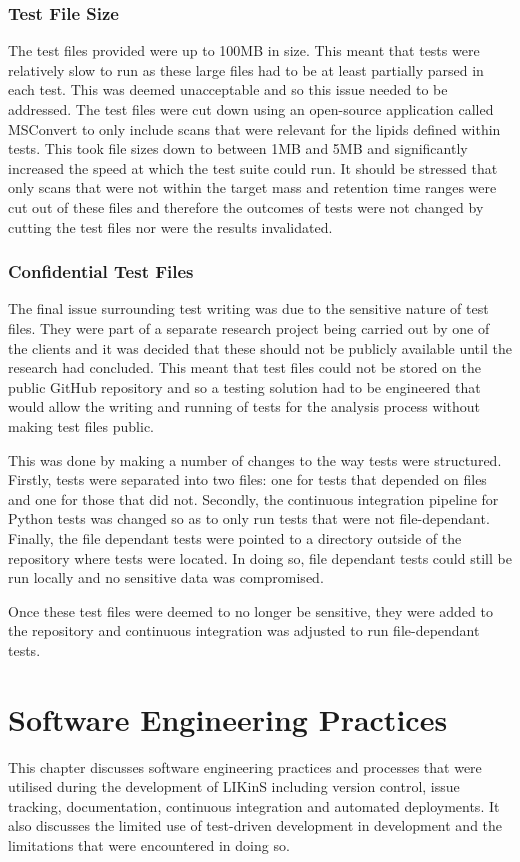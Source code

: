 \documentclass{l4proj}
\begin{document}
\subsection{Test File Size}
The test files provided were up to 100MB in size. This meant that tests were relatively slow to run as these large files had to be at least partially parsed in each test. This was deemed unacceptable and so this issue needed to be addressed. The test files were cut down using an open-source application called MSConvert to only include scans that were relevant for the lipids defined within tests. This took file sizes down to between 1MB and 5MB and significantly increased the speed at which the test suite could run. It should be stressed that only scans that were not within the target mass and retention time ranges were cut out of these files and therefore the outcomes of tests were not changed by cutting the test files nor were the results invalidated. 

\subsection{Confidential Test Files}
The final issue surrounding test writing was due to the sensitive nature of test files. They were part of a separate research project being carried out by one of the clients and it was decided that these should not be publicly available until the research had concluded. This meant that test files could not be stored on the public GitHub repository and so a testing solution had to be engineered that would allow the writing and running of tests for the analysis process without making test files public.

This was done by making a number of changes to the way tests were structured. Firstly, tests were separated into two files: one for tests that depended on files and one for those that did not. Secondly, the continuous integration pipeline for Python tests was changed so as to only run tests that were not file-dependant. Finally, the file dependant tests were pointed to a directory outside of the repository where tests were located. In doing so, file dependant tests could still be run locally and no sensitive data was compromised.

Once these test files were deemed to no longer be sensitive, they were added to the repository and continuous integration was adjusted to run file-dependant tests.

\chapter{Software Engineering Practices}
This chapter discusses software engineering practices and processes that were utilised during the development of LIKinS including version control, issue tracking, documentation, continuous integration and automated deployments. It also discusses the limited use of test-driven development in development and the limitations that were encountered in doing so.
\end{document}
